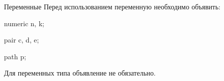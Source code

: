 

\begin{frame}{Переменные}
Перед использованием переменную необходимо объявить:
\begin{programlisting}
numeric n, k;\par
\pause
pair c, d, e;\par
\pause
path p;
\end{programlisting}
\pause

Для переменных типа  объявление не обязательно.
\end{frame}

